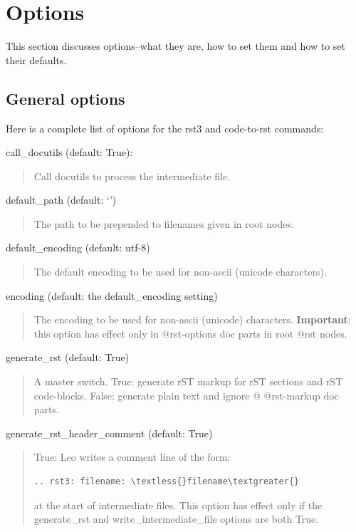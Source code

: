 \documentclass[a4paper,10pt,english]{sphinxmanual}
\begin{document}
\section{Options}
\label{rstplugin3:options}
This section discusses options--what they are, how to set them and how to set their defaults.


\subsection{General options}
\label{rstplugin3:general-options}
Here is a complete list of options for the rst3 and code-to-rst commands:
\begin{description}
\end{description}

call\_docutils (default: True):
\begin{quote}

Call docutils to process the intermediate file.
\end{quote}

default\_path (default: `')
\begin{quote}

The path to be prepended to filenames given in root nodes.
\end{quote}

default\_encoding (default: utf-8)
\begin{quote}

The default encoding to be used for non-ascii (unicode characters).
\end{quote}

encoding (default: the default\_encoding setting)
\begin{quote}

The encoding to be used for non-ascii (unicode) characters.
\textbf{Important}: this option has effect only in @rst-options doc parts
in root @rst nodes.
\end{quote}

generate\_rst (default: True)
\begin{quote}

A master switch.
True: generate rST markup for rST sections and rST code-blocks.
False: generate plain text and ignore @ @rst-markup doc parts.
\end{quote}

generate\_rst\_header\_comment (default: True)
\begin{quote}

True: Leo writes a comment line of the form:

\begin{Verbatim}[commandchars=\\\{\}]
.. rst3: filename: \textless{}filename\textgreater{}
\end{Verbatim}

at the start of intermediate files. This option has effect only if the
generate\_rst and write\_intermediate\_file options are both True.
\end{quote}
\end{document}
